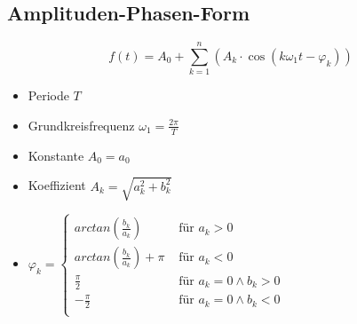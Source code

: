 \subsection{Amplituden-Phasen-Form}
\[
f(t) = A_0 + \sum_{k=1}^{n}
(A_k \cdot \cos(k \omega_1 t  - \varphi_k))
\]
\begin{itemize}
	\item Periode $T$
	\item Grundkreisfrequenz $\omega_1 = \frac{2\pi}{T}$
	\item Konstante $A_0 = a_0$
	\item Koeffizient $A_k = \sqrt{a_k^2 + b_k^2}$
	\item $\varphi_k =  \begin{cases}
	arctan\left(\frac{b_k}{a_k}\right) & \text{ für } a_k > 0 \\
	arctan\left(\frac{b_k}{a_k}\right) + \pi & \text{ für } a_k < 0 \\
	\frac{\pi}{2} & \text{ für } a_k = 0 \wedge b_k > 0\\
	-\frac{\pi}{2} & \text{ für } a_k = 0 \wedge b_k < 0\\
	\end{cases}$
\end{itemize}

